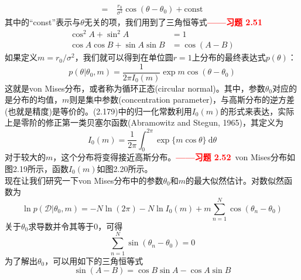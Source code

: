 \documentclass[b5paper]{book}
\numberwithin{equation}{chapter}
\begin{document}
{\begin{equation}
\begin{split}
		= &\ \frac{r_0}{\sigma^2}\cos(\theta-\theta_0)+\mathrm{const}
	\end{split}
	\end{equation}
	其中的“const”表示与$\theta$无关的项，我们用到了三角恒等式\textcolor{red}{\textbf{——习题 2.51}}
	\begin{align}
		\cos^2A + \sin^2A &= 1 \\
		\cos A\cos B +\sin A \sin B &= \cos(A-B)
	\end{align}
	如果定义$m=r_0/\sigma^2$，我们就可以得到在单位圆$r=1$上分布的最终表达式$p(\theta)$：
	\begin{equation}
		p(\theta|\theta_0,m)=\frac{1}{2\pi I_0(m)}\exp{m \cos (\theta-\theta_0)}
	\end{equation}
	这就是von Mises分布，或者称为循环正态(circular normal)。其中，参数$\theta_0$对应的是分布的均值，$m$则是集中参数(concentration parameter)，与高斯分布的逆方差(也就是精度)是等价的。(2.179)中的归一化常数利用$I_0(m)$的形式来表达，实际上是零阶的修正第一类贝塞尔函数(Abramowitz and Stegun, 1965)，其定义为
	\begin{equation}
		I_0(m)=\frac{1}{2\pi}\int_0^{2\pi}\exp\{m \cos \theta\}\ \mathrm{d}\theta
	\end{equation}
	对于较大的$m$，这个分布将变得接近高斯分布。\textcolor{red}{\textbf{——习题 2.52}}\ von Mises分布如图2.19所示，函数$I_0(m)$如图2.20所示。\\
	\indent 现在让我们研究一下von Mises分布中的参数$\theta_0$和$m$的最大似然估计。对数似然函数为
	\begin{equation}
		\ln p(\mathcal{D}|\theta_0,m)=-N\ln(2\pi)-N\ln I_0(m)+m\sum_{n=1}^N\cos (\theta_n-\theta_0)
	\end{equation}
	关于$\theta_0$求导数并令其等于0，可得
	\begin{equation}
		\sum_{n=1}^N\sin(\theta_n-\theta_0)=0
	\end{equation}
	为了解出$\theta_0$，可以用如下的三角恒等式
	\begin{equation}
		\sin(A-B)=\cos B\sin A - \cos A \sin B
	\end{equation}
	\begin{figure}[H]
		\begin{minipage}[t]{0.5\linewidth}
		\centering

\end{minipage}
\end{figure}}
\end{document}
